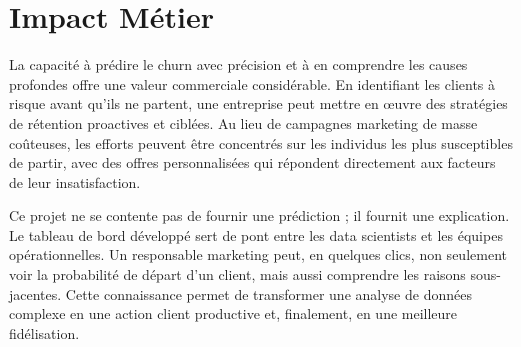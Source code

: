 \section{Impact Métier}
La capacité à prédire le churn avec précision et à en comprendre les causes profondes offre une valeur commerciale considérable. En identifiant les clients à risque avant qu'ils ne partent, une entreprise peut mettre en œuvre des stratégies de rétention proactives et ciblées. Au lieu de campagnes marketing de masse coûteuses, les efforts peuvent être concentrés sur les individus les plus susceptibles de partir, avec des offres personnalisées qui répondent directement aux facteurs de leur insatisfaction.

Ce projet ne se contente pas de fournir une prédiction ; il fournit une explication. Le tableau de bord développé sert de pont entre les data scientists et les équipes opérationnelles. Un responsable marketing peut, en quelques clics, non seulement voir la probabilité de départ d'un client, mais aussi comprendre les raisons sous-jacentes. Cette connaissance permet de transformer une analyse de données complexe en une action client productive et, finalement, en une meilleure fidélisation.
